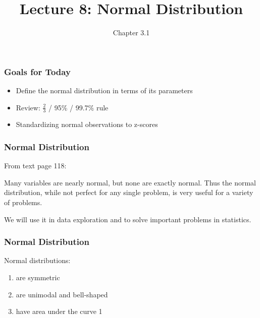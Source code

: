 \documentclass[handout]{beamer}
\title{Lecture 8: Normal Distribution}
\author{Chapter 3.1}
\date{}
\newcommand{\blue}[1]{\textcolor{blue2}{#1}}
\begin{document}
\begin{frame}
\titlepage
\end{frame}


\begin{frame}
\frametitle{Goals for Today}

\begin{itemize}
\item Define the normal distribution in terms of its \blue{parameters}
\item Review: $\frac{2}{3}$ / 95\% / 99.7\% rule
\item Standardizing normal observations to \blue{z-scores}
\end{itemize}


\end{frame}


\begin{frame}[fragile]
\frametitle{Normal Distribution}
From text page 118:

\vspace{0.5cm}

Many variables are nearly normal, but none are exactly normal. Thus the normal
distribution, while not perfect for any single problem, is very useful for a variety
of problems.

\vspace{0.5cm}

We will use it in data exploration and to solve important problems
in statistics.
\end{frame}


\begin{frame}[fragile]
\frametitle{Normal Distribution}
Normal distributions:
\begin{enumerate}
\item are symmetric
\item are unimodal and bell-shaped
\item have area under the curve 1
\end{enumerate}

\end{frame}
\end{document}
